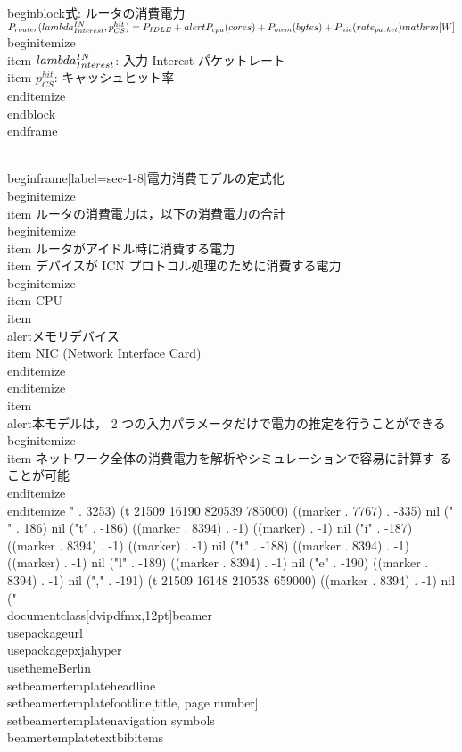 {\\begin{block}{式: ルータの消費電力}%
$P_{router}(\\lambda^{IN}_{Interest}, p^{hit}_{CS}) = P_{IDLE} +
\\alert{P_{cpu}(cores)} + P_{mem}(bytes) + P_{nic}(rate_{packet}) \\mathrm{[W]}$
\\begin{itemize}
\\item $\\lambda^{IN}_{Interest}$: 入力 Interest パケットレート
\\item $p^{hit}_{CS}$: キャッシュヒット率
\\end{itemize}
\\end{block}
\\end{frame}

\\begin{frame}[label=sec-1-8]{電力消費モデルの定式化}
\\begin{itemize}
\\item ルータの消費電力は，以下の消費電力の合計
\\begin{itemize}
\\item ルータがアイドル時に消費する電力
\\item デバイスが ICN プロトコル処理のために消費する電力
\\begin{itemize}
\\item CPU
\\item \\alert{メモリデバイス}
\\item NIC (Network Interface Card)
\\end{itemize}
\\end{itemize}
\\item \\alert{本モデルは， 2 つの入力パラメータだけで電力の推定を行うことができる}
\\begin{itemize}
\\item ネットワーク全体の消費電力を解析やシミュレーションで容易に計算す
ることが可能
\\end{itemize}
\\end{itemize}
" . 3253) (t 21509 16190 820539 785000) ((marker . 7767) . -335) nil (" " . 186) nil ("t" . -186) ((marker . 8394) . -1) ((marker) . -1) nil ("i" . -187) ((marker . 8394) . -1) ((marker) . -1) nil ("t" . -188) ((marker . 8394) . -1) ((marker) . -1) nil ("l" . -189) ((marker . 8394) . -1) nil ("e" . -190) ((marker . 8394) . -1) nil ("," . -191) (t 21509 16148 210538 659000) ((marker . 8394) . -1) nil ("%
\\documentclass[dvipdfmx,12pt]{beamer}
\\usepackage{url}
\\usepackage{pxjahyper}
\\usetheme{Berlin}
\\setbeamertemplate{headline}{}
\\setbeamertemplate{footline}[title, page number]
\\setbeamertemplate{navigation symbols}{}
\\beamertemplatetextbibitems


}
